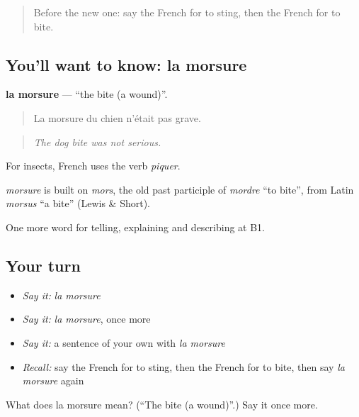\begin{quote}
Before the new one: say the French for to sting, then the French for to bite.
\end{quote}

\subsection*{You'll want to know: la morsure}
\textbf{la morsure} — \textquotedblleft{}the bite (a wound)\textquotedblright{}.

\begin{quote}
La morsure du chien n'était pas grave.
\end{quote}

\begin{quote}
\emph{The dog bite was not serious.}
\end{quote}

For insects, French uses the verb \emph{piquer}.

\begin{cousinweb}
\emph{morsure} is built on \emph{mors}, the old past participle of \emph{mordre} \textquotedblleft{}to bite\textquotedblright{}, from Latin \emph{morsus} \textquotedblleft{}a bite\textquotedblright{} (Lewis \& Short).
\end{cousinweb}

\begin{grammarlens}[title={What you've built}]
One more word for telling, explaining and describing at B1.
\end{grammarlens}

\subsection*{Your turn}
\begin{itemize}
\raggedright
  \item \emph{Say it:} \emph{la morsure}
  \item \emph{Say it:} \emph{la morsure}, once more
  \item \emph{Say it:} a sentence of your own with \emph{la morsure}
  \item \emph{Recall:} say the French for to sting, then the French for to bite, then say \emph{la morsure} again
\end{itemize}

\begin{tcolorbox}[breakable,colback=teal!4,colframe=teal!35!black,title={Before you move on}]
What does la morsure mean? (\textquotedblleft{}The bite (a wound)\textquotedblright{}.) Say it once more.
\end{tcolorbox}
